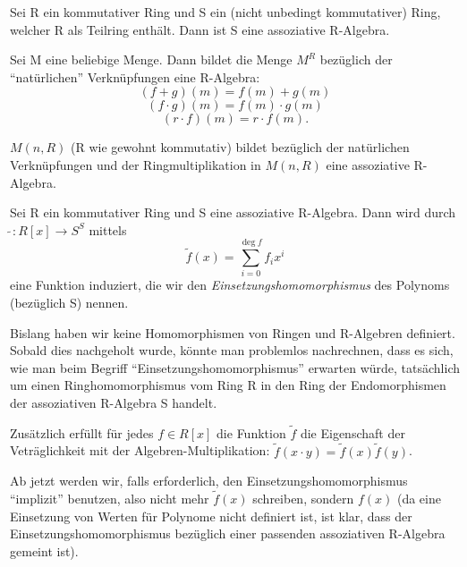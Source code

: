 \documentclass[10pt]{scrbook}
\begin{document}
\begin{Bsp}
Sei R ein kommutativer Ring und S ein (nicht unbedingt kommutativer) Ring, welcher R als Teilring enthält. Dann ist S eine assoziative R-Algebra.
\end{Bsp}

\begin{Bsp}
Sei M eine beliebige Menge. Dann bildet die Menge $M^R$ bezüglich der "`natürlichen"' Verknüpfungen eine R-Algebra:
\begin{displaymath}
	(f+g)(m)=f(m)+g(m)
\end{displaymath}
\begin{displaymath}
	(f\cdot g)(m)=f(m)\cdot g(m)
\end{displaymath}
\begin{displaymath}
	(r\cdot f)(m)=r \cdot f(m).
\end{displaymath}
\end{Bsp}

\begin{Bsp}
$M(n, R)$ (R wie gewohnt kommutativ) bildet bezüglich der natürlichen Verknüpfungen und der Ringmultiplikation in $M(n, R)$ eine assoziative R-Algebra.
\end{Bsp}

\begin{Def}
Sei R ein kommutativer Ring und S eine assoziative R-Algebra. Dann wird durch $\widetilde{\ }: R[x] \rightarrow S^S$ mittels
\begin{displaymath}
	\widetilde{f}(x)=\sum\limits_{i=0}^{\deg f}{f_i x^i}
\end{displaymath}
eine Funktion induziert, die wir den \emph{Einsetzungshomomorphismus} des Polynoms (bezüglich S) nennen.
\end{Def}

\begin{Bem}
Bislang haben wir keine Homomorphismen von Ringen und R-Algebren definiert. Sobald dies nachgeholt wurde, könnte man problemlos nachrechnen, dass es sich, wie man beim Begriff "`Einsetzungshomomorphismus"' erwarten würde, tatsächlich um einen Ringhomomorphismus vom Ring R in den Ring der Endomorphismen der assoziativen R-Algebra S handelt.

Zusätzlich erfüllt für jedes $f\in R[x]$ die Funktion $\widetilde{f}$ die Eigenschaft der Veträglichkeit mit der Algebren-Multiplikation: $\widetilde{f}(x\cdot y)=\widetilde{f}(x) \widetilde{f}(y)$.
\end{Bem}

\begin{Bem}
Ab jetzt werden wir, falls erforderlich, den Einsetzungshomomorphismus "`implizit"' benutzen, also nicht mehr $\widetilde{f}(x)$ schreiben, sondern $f(x)$ (da eine Einsetzung von Werten für Polynome nicht definiert ist, ist klar, dass der Einsetzungshomomorphismus bezüglich einer passenden assoziativen R-Algebra gemeint ist).
\end{Bem}
\end{document}
